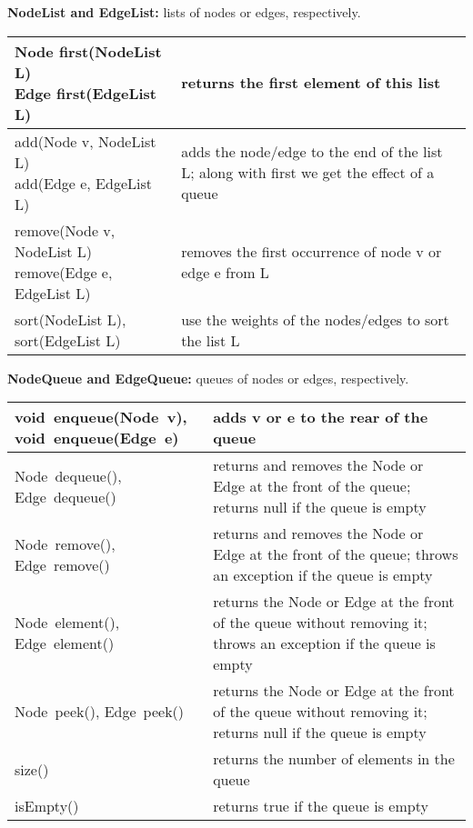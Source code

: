 \begin{table}
  \small
  \centering

  \textbf{NodeList and EdgeList:} lists of nodes or edges, respectively.
  
  \medskip
  \begin{tabular}{| m{} | m{} |}
    \hline
    \shortstack[l]{
      \textsf{Node first(NodeList L)}\\
      \textsf{Edge first(EdgeList L)}
    }
    &
    returns the first element of this list
    \\ \hline
    \shortstack[l]{
      \textsf{add(Node v, NodeList L)}\\
      \textsf{add(Edge e, EdgeList L)}
    }
    &
    adds the node/edge to the end of the list \textsf{L}; along with \textsf{first}
    we get the effect of a queue
    \\ \hline
    \shortstack[l]{
      \textsf{remove(Node v, NodeList L)}\\
      \textsf{remove(Edge e, EdgeList L)}
    }
    &
    removes the first occurrence of node \textsf{v} or edge \textsf{e} from \textsf{L}
    \\ \hline
    \textsf{sort(NodeList L)}, \textsf{sort(EdgeList L)}
    &
    use the weights of the nodes/edges to sort the list \textsf{L}
    \\ \hline
  \end{tabular}  
  
\bigskip
  \textbf{NodeQueue and EdgeQueue:} queues of nodes or edges, respectively.

  \medskip
  \begin{tabular}{| m{} | m{} |}
    \hline
    \shortstack[l]{
      \textsf{void~enqueue(Node~v)},\\
      \textsf{void~enqueue(Edge~e)}
    }
    &
    adds \textsf{v} or \textsf{e} to the rear of the queue
    \\ \hline
    \textsf{Node~dequeue()}, \textsf{Edge~dequeue()}
    &
    returns and removes the \textsf{Node} or \textsf{Edge} at the front of the queue;
    returns \textsf{null} if the queue is empty
    \\ \hline
    \textsf{Node~remove()}, \textsf{Edge~remove()}
    &
    returns and removes the \textsf{Node} or \textsf{Edge} at the front of the queue;
    throws an exception if the queue is empty
    \\ \hline
    \textsf{Node~element()}, \textsf{Edge~element()}
    &
    returns the \textsf{Node} or \textsf{Edge} at the front of the queue
    without removing it;
    throws an exception if the queue is empty
    \\ \hline
    \textsf{Node~peek()}, \textsf{Edge~peek()}
    &
    returns the \textsf{Node} or \textsf{Edge} at the front of the queue
    without removing it;
    returns \textsf{null} if the queue is empty
    \\ \hline
    \textsf{size()}
    &
    returns the number of elements in the queue
    \\ \hline
    \textsf{isEmpty()}
    &
    returns \textsf{true} if the queue is empty 
    \\ \hline
  \end{tabular}


\end{table}
